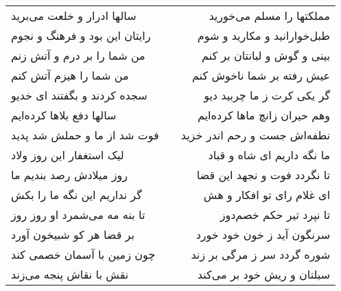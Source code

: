 \begin{center}
\begin{longtable}{l p{0.5cm} r}
سالها ادرار و خلعت می‌برید
&&
مملکتها را مسلم می‌خورید
\\
رایتان این بود و فرهنگ و نجوم
&&
طبل‌خوارانید و مکارید و شوم
\\
من شما را بر درم و آتش زنم
&&
بینی و گوش و لبانتان بر کنم
\\
من شما را هیزم آتش کنم
&&
عیش رفته بر شما ناخوش کنم
\\
سجده کردند و بگفتند ای خدیو
&&
گر یکی کرت ز ما چربید دیو
\\
سالها دفع بلاها کرده‌ایم
&&
وهم حیران زانچ ماها کرده‌ایم
\\
فوت شد از ما و حملش شد پدید
&&
نطفه‌اش جست و رحم اندر خزید
\\
لیک استغفار این روز ولاد
&&
ما نگه داریم ای شاه و قباد
\\
روز میلادش رصد بندیم ما
&&
تا نگردد فوت و نجهد این قضا
\\
گر نداریم این نگه ما را بکش
&&
ای غلام رای تو افکار و هش
\\
تا بنه مه می‌شمرد او روز روز
&&
تا نپرد تیر حکم خصم‌دوز
\\
بر قضا هر کو شبیخون آورد
&&
سرنگون آید ز خون خود خورد
\\
چون زمین با آسمان خصمی کند
&&
شوره گردد سر ز مرگی بر زند
\\
نقش با نقاش پنجه می‌زند
&&
سبلتان و ریش خود بر می‌کند
\\
\end{longtable}
\end{center}
